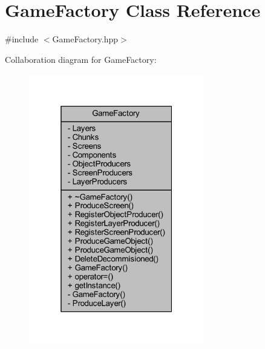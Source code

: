 \hypertarget{class_game_factory}{\section{Game\-Factory Class Reference}
\label{class_game_factory}
}


{\ttfamily \#include $<$Game\-Factory.\-hpp$>$}



Collaboration diagram for Game\-Factory\-:\nopagebreak
\begin{figure}[H]
\begin{center}
\leavevmode
\includegraphics[width=217pt]{class_game_factory__coll__graph}
\end{center}
\end{figure}
